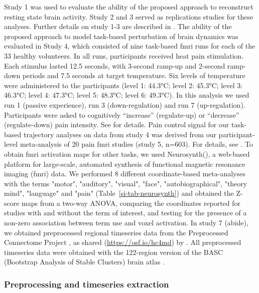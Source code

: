 \documentclass{article}
\begin{document}
Study 1 was used to evaluate the ability of the proposed approach to reconstruct resting state brain activity. Study 2 and 3 served as replications studies for these analyses. Further details on study 1-3 are described in \href{https://doi.org/10.1038/s41467-019-13785-z}{}. The ability of the proposed approach to model task-based perturbation of brain dynamics was evaluated in Study 4, which consisted of nine task-based \acrshort{fmri} runs for each of the 33 healthy volunteers. In all runs, participants received heat pain stimulation. Each stimulus lasted 12.5 seconds, with 3-second ramp-up and 2-second ramp-down periods and 7.5 seconds at target temperature. Six levels of temperature were a\acrshort{dm}inistered to the participants (level 1: 44.3°C; level 2: 45.3°C; level 3: 46.3°C; level 4: 47.3°C; level 5: 48.3°C; level 6: 49.3°C). In this analysis we used run 1 (passive experience),  run 3 (down-regulation) and run 7 (up-regulation). Participants were asked to cognitively ``increase'' (regulate-up) or ``decrease'' (regulate-down) pain intensity. See \citet{woo2015distinct} for details.
Pain control signal for our task-based trajectory analyses on data from study 4 was derived from our participant-level meta-analysis of 20 pain \acrshort{fmri} studies (study 5, n=603). For details, see \citet{zunhammer2021meta}.
To obtain \acrshort{fmri} activation maps for other tasks, we used Neurosynth(\href{https://doi.org/10.3389/conf.fninf.2011.08.00058}{}), a web-based platform for large-scale, automated synthesis of functional magnetic resonance imaging (\acrshort{fmri}) data. We performed 8 different coordinate-based meta-analyses with the terms "motor", "auditory", "visual", "face", "autobiographical", "theory mind", "language" and "pain" (Table~\ref{si-tab-neurosynth}) and obtained the Z-score maps from a two-way ANOVA, comparing the coordinates reported for studies with and without the term of interest, and testing for the presence of a non-zero association between term use and voxel activation.
In study 7 (\acrshort{abide}), we obtained preprocessed regional timeseries data from the Preprocessed Connectome Project \citep{craddock2013towards}, as shared (\href{https://osf.io/hc4md}{https://osf.io/hc4md}) by \citet{dadi2019benchmarking}. All preprocessed timeseries data were obtained with the 122-region version of the BASC (Bootstrap Analysis of Stable Clusters) brain atlas \citep{bellec2010multi}.

\subsubsection{Preprocessing and timeseries extraction}
\end{document}
